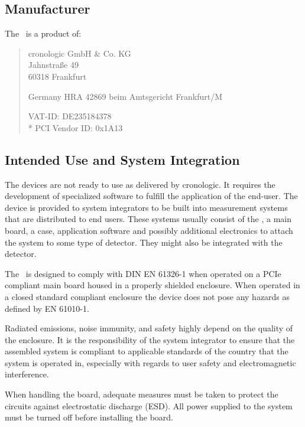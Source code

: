 \subsection{Manufacturer\label{cp:manu}}

The \deviceName\ is a product of:\

\begin{quote}
	cronologic GmbH \& Co. KG\\
	Jahnstra\ss{}e 49\\
	60318 Frankfurt\par
	Germany
	\noindent HRA 42869 beim Amtsgericht Frankfurt/M\par
	\noindent VAT-ID: DE235184378 \\*
	\noindent PCI Vendor ID: 0x1A13
\end{quote}

\subsection{Intended Use and System Integration}

	The devices are not ready to use as delivered by cronologic. It requires the development of specialized software to fulfill the application of the end-user. The device is provided to system integrators to be built into measurement systems that are distributed to end users. These systems usually consist of the \deviceName, a main board, a case, application software and possibly additional electronics to attach the system to some type of detector. They might also be integrated with the detector.\par

	The \deviceName\ is designed to comply with DIN EN 61326-1 when operated on a PCIe compliant main board housed in a properly shielded enclosure. 
	When operated in a closed standard compliant enclosure the device does not pose any hazards as defined by EN 61010-1.\par

	Radiated emissions, noise immunity, and safety highly depend on the quality of the enclosure. 
	It is the responsibility of the system integrator to ensure that the assembled system is compliant to applicable standards of the country that the system is operated in, especially with regards to user safety and electromagnetic interference. \par
	 
	When handling the board, adequate measures must be taken to protect the circuits against electrostatic discharge (ESD). All power supplied to the system must be turned off before installing the board.

